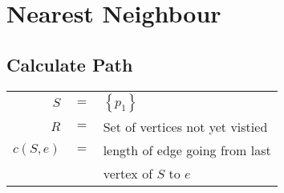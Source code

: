 \documentclass[
	final,
	a4paper,
	oneside,
	parskip=full,
	headings=standardclasses,
	headings=big,
	pointednumbers
]{scrartcl}
\newcommand{\kl}[1]{{\left( #1 \right)}}
\newcommand{\kq}[1]{{\left\{ #1 \right\}}}
\begin{document}

    \begin{minipage}[t]{.5\linewidth}
        \section*{Nearest Neighbour}
        
        \subsection*{Calculate Path}
    \end{minipage}
    \begin{minipage}[t]{.5\linewidth}
            \begin{tabular}[t]{@{} r @{\hskip 1mm} c @{\hskip 1mm} l @{}}
                         $S$ & $=$ & $\kq{p_1}$ \\
                         $R$ & $=$ & Set of vertices not yet vistied \\
                $c\kl{S, e}$ & $=$ & length of edge going from last \\
                             &     & vertex of $S$ to $e$
            \end{tabular}
    \end{minipage}
\end{document}
